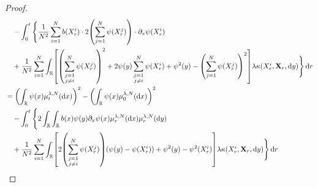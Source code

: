 \documentclass{article}
\begin{document}
\begin{proof}
\begin{equation}
\begin{split}
                                               & \quad {} - \int_0^t \Bigg\{ \frac{1}{N^2} \sum_{i=1}^N b(X_r^i) \cdot 2 \br*{ \sum_{j=1}^N \psi(X_r^j) } \cdot \partial_x \psi(X_r^i)                                                                                                                                                                      \\
                                               & \quad + \frac{1}{N^2} \sum_{i=1}^N \int_\potspace \sbr*{ \br*{ \sum_{\substack{j=1                                                                                                                                                                                                                         \\ j \neq i}}^N \psi(X_r^j) }^2 + 2 \psi(y) \sum_{\substack{j=1 \\ j \neq i}}^N \psi(X_r^i) + \psi^2(y) - \br*{ \sum_{j=1}^N \psi(X_r^j) }^2 } \lambda \kappa(X_r^i,\bm{X}_r,\odif{y}) \Bigg\} \odif{r} \\
                                               & = \br*{ \int_\potspace \psi(x) \mu_t^{\lambda, N}(\odif{x}) }^2 - \br*{ \int_\potspace \psi(x) \mu_0^{\lambda, N}(\odif{x}) }^2                                                                                                                                                                            \\
                                               & \quad {} - \int_0^t \Bigg\{ 2 \int_\potspace \int_\potspace b(x) \psi(y) \partial_x \psi (x) \mu_r^{\lambda,N}(\odif{x}) \mu_r^{\lambda,N}(\odif{y})                                                                                                                                                       \\
                                               & \quad + \frac{1}{N^2} \sum_{i=1}^N \int_\potspace \sbr*{ 2 \br*{\sum_{\substack{j=1                                                                                                                                                                                                                        \\ j \neq i}}^N \psi(X_r^j)} (\psi(y) - \psi(X_r^i)) + \psi^2(y) - \psi^2(X_r^i) } \lambda \kappa(X_r^i,\bm{X}_r,\odif{y}) \Bigg\} \odif{r} \\

\end{split}
\end{equation}
\end{proof}
\end{document}
